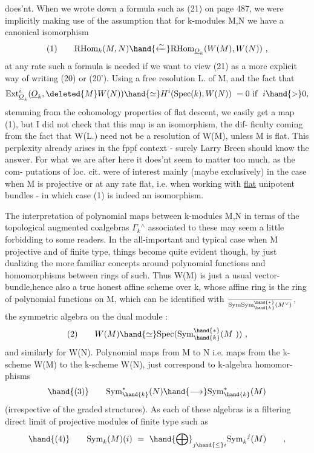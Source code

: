 
does'nt.  When we wrote down a formula such as (21) on page 487,  we were
implicitly making use of the assumption that for k-modules M,N we have
a canonical isomorphism
\[ (1) \qquad \mathrm{RHom}_{k}(M,N) \hand{\xleftarrow{\sim}} \mathrm{RHom}_{\underline{O}_k}(W(M),W(N)) \ , \]
at any rate such a formula is needed if we want to view (21) as a more
explicit way of writing (20) or (20').  Using a free resolution L. of M,
and the fact that
\[ \mathrm{Ext}^{i}_{\underline{O}_k}(\underline{O}_k, \deleted{M} W(N)) \hand{\simeq} H^{i}(\mathrm{Spec}(k), W(N)) \ = 0 \ \text{if} \ \ i \hand{>} 0, \]
stemming from the cohomology properties of flat descent,  we easily get
a map (1),  but I did not check that this map is an isomorphism,  the dif-%
ficulty coming  from the fact that  W(L.)  need not be a resolution of
W(M),  unless M is flat.  This perplexity already arises in the fppf
context  -  surely Larry Breen should know the answer.  For what we are
 after here  it does'nt seem to  matter too much,  as the com-%
putations of loc. cit.  were of interest mainly (maybe exclusively) in the
case when M is projective or at any rate flat,  i.e. when working with
\uline{flat} unipotent bundles   -  in which case (1) is indeed an isomorphism.

The interpretation of polynomial maps between k-modules M,N  in terms
of the topological augmented coalgebras  $\Gamma_k{}^{\wedge}$ associated to these  may seem
a little forbidding to some readers.  In the all-important and typical
case when M   projective and of finite type,  things become quite evident
though,  by just dualizing the more familiar concepts around polynomial
functions and homomorphisms between rings of such.  Thus W(M) is just a
usual vector-bundle,hence also a true honest affine scheme over k,
whose affine ring is the ring of polynomial functions on M,  which can
be identified with  $\over{\mathrm{Sym}}{\mathrm{Sym}}^{\hand{*}}_{\hand{k}}(M^{\vee})$,  the symmetric algebra on the dual module :
\[ (2) \qquad W(M) \hand{\simeq} \mathrm{Spec}(\mathrm{Sym}^{\hand{*}}_{\hand{k}}(M\ )) \ , \]
and similarly for W(N).  Polynomial maps from M to N i.e. maps from the
k-scheme W(M) to the k-scheme W(N),   just correspond to k-algebra homomor-%
phisms
\[ \hand{(3)} \qquad \mathrm{Sym}^{*}_{\hand{k}}(N) \hand{\longrightarrow} \mathrm{Sym}^{*}_{\hand{k}}(M) \]
(irrespective of the graded structures).  As each of these algebras is
a filtering direct limit of  projective modules of finite type such as
\[ \hand{(4)} \qquad \mathrm{Sym}_{k}(M)(i) \ = \ \hand{\bigoplus}_{j \hand{\leq} i} \mathrm{Sym}_{k}{}^{j}(M) \qquad , \]

